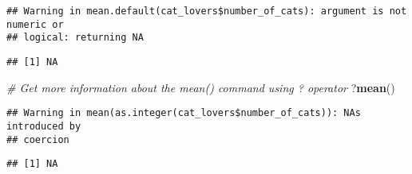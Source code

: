 \documentclass[
]{article}
\newenvironment{Shaded}{\begin{snugshade}}{\end{snugshade}}
\newcommand{\CommentTok}[1]{\textcolor[rgb]{0.56,0.35,0.01}{\textit{#1}}}
\newcommand{\FunctionTok}[1]{\textcolor[rgb]{0.13,0.29,0.53}{\textbf{#1}}}
\newcommand{\NormalTok}[1]{#1}
\newcommand{\SpecialCharTok}[1]{\textcolor[rgb]{0.81,0.36,0.00}{\textbf{#1}}}
\begin{document}
\begin{Shaded}
\end{Shaded}

\begin{verbatim}
## Warning in mean.default(cat_lovers$number_of_cats): argument is not numeric or
## logical: returning NA
\end{verbatim}

\begin{verbatim}
## [1] NA
\end{verbatim}

\begin{Shaded}
\begin{Highlighting}[]
\CommentTok{\# Get more information about the mean() command using ? operator}
\NormalTok{?}\FunctionTok{mean}\NormalTok{()}
\end{Highlighting}
\end{Shaded}

\begin{Shaded}
\end{Shaded}

\begin{verbatim}
## Warning in mean(as.integer(cat_lovers$number_of_cats)): NAs introduced by
## coercion
\end{verbatim}

\begin{verbatim}
## [1] NA
\end{verbatim}

\begin{Shaded}
\end{Shaded}
\end{document}
